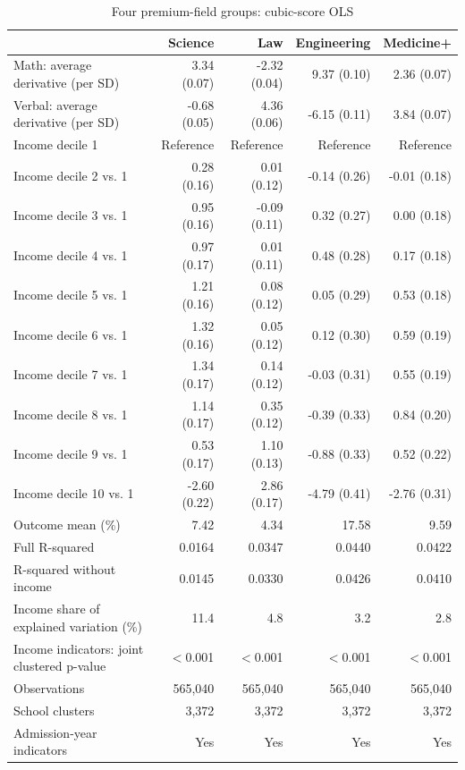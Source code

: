 \begin{table}[!htbp]\centering
\caption{Four premium-field groups: cubic-score OLS}
\label{tab:premium-cubic-income-fields}
\small
\begin{tabular}{lrrrr}\hline\hline
 & Science & Law & Engineering & Medicine+ \\ \hline
Math: average derivative (per SD) & 3.34 (0.07) & -2.32 (0.04) & 9.37 (0.10) & 2.36 (0.07) \\
Verbal: average derivative (per SD) & -0.68 (0.05) & 4.36 (0.06) & -6.15 (0.11) & 3.84 (0.07) \\
Income decile 1 & Reference & Reference & Reference & Reference \\
Income decile 2 vs. 1 & 0.28 (0.16) & 0.01 (0.12) & -0.14 (0.26) & -0.01 (0.18) \\
Income decile 3 vs. 1 & 0.95 (0.16) & -0.09 (0.11) & 0.32 (0.27) & 0.00 (0.18) \\
Income decile 4 vs. 1 & 0.97 (0.17) & 0.01 (0.11) & 0.48 (0.28) & 0.17 (0.18) \\
Income decile 5 vs. 1 & 1.21 (0.16) & 0.08 (0.12) & 0.05 (0.29) & 0.53 (0.18) \\
Income decile 6 vs. 1 & 1.32 (0.16) & 0.05 (0.12) & 0.12 (0.30) & 0.59 (0.19) \\
Income decile 7 vs. 1 & 1.34 (0.17) & 0.14 (0.12) & -0.03 (0.31) & 0.55 (0.19) \\
Income decile 8 vs. 1 & 1.14 (0.17) & 0.35 (0.12) & -0.39 (0.33) & 0.84 (0.20) \\
Income decile 9 vs. 1 & 0.53 (0.17) & 1.10 (0.13) & -0.88 (0.33) & 0.52 (0.22) \\
Income decile 10 vs. 1 & -2.60 (0.22) & 2.86 (0.17) & -4.79 (0.41) & -2.76 (0.31) \\
\hline
Outcome mean (\%) & 7.42 & 4.34 & 17.58 & 9.59 \\
Full R-squared & 0.0164 & 0.0347 & 0.0440 & 0.0422 \\
R-squared without income & 0.0145 & 0.0330 & 0.0426 & 0.0410 \\
Income share of explained variation (\%) & 11.4 & 4.8 & 3.2 & 2.8 \\
Income indicators: joint clustered p-value & $<$0.001 & $<$0.001 & $<$0.001 & $<$0.001 \\
Observations & 565,040 & 565,040 & 565,040 & 565,040 \\
School clusters & 3,372 & 3,372 & 3,372 & 3,372 \\
Admission-year indicators & Yes & Yes & Yes & Yes \\

\end{tabular}
\end{table}
